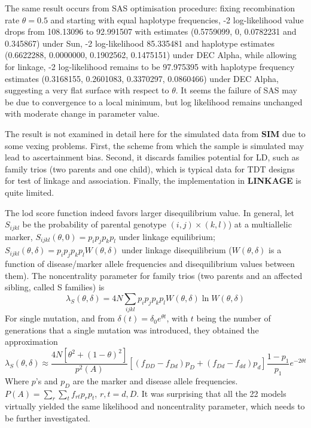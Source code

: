 \documentclass[11pt]{article}
\begin{document}
The same result occurs from SAS optimisation procedure:  fixing recombination
rate $\theta=0.5$ and starting with equal haplotype frequencies, -2
log-likelihood value drops from 108.13096 to 92.991507 with estimates
(0.5759099, 0, 0.0782231 and 0.345867) under Sun, -2 log-likelihood 85.335481
and haplotype estimates (0.6622288, 0.0000000, 0.1902562, 0.1475151) under DEC
Alpha, while allowing for linkage, -2 log-likelihood remains to be 97.975395
with haplotype frequency estimates (0.3168155, 0.2601083, 0.3370297, 0.0860466)
under DEC Alpha, suggesting a very flat surface with respect to $\theta$.  It
seems the failure of SAS may be due to convergence to a local minimum, but log
likelihood remains unchanged with moderate change in parameter value.

The result is not examined in detail here for the simulated data from {\bf
SIM} due to some vexing problems.  First, the scheme from which the sample is
simulated may lead to ascertainment bias.  Second, it discards families
potential for LD, such as family trios (two parents and one child), which is
typical data for TDT designs for test of linkage and association.  Finally, the
implementation in {\bf LINKAGE} is quite limited.

The lod score function indeed favors larger disequilibrium value.  In general,
let $S_{ijkl}$ be the probability of parental genotype $(i,j)\times (k,l)$) at
a multiallelic marker, $S_{ijkl}(\theta, 0)=p_ip_jp_kp_l$ under linkage
equilibrium; $S_{ijkl}(\theta,\delta)=p_ip_jp_kp_lW(\theta,\delta)$ under
linkage disequilibrium ($W(\theta,\delta)$ is a function of disease/marker
allele frequencies and disequilibrium values between them).  The noncentrality
parameter for family trios (two parents and an affected sibling, called S
families) is $$\lambda_S(\theta,\delta)=4N
\sum_{ijkl}p_ip_jp_kp_lW(\theta,\delta)\ln W(\theta,\delta)$$ For single
mutation, and from $\delta(t)=\delta_0e^{\theta t}$, with $t$ being the number
of generations that a single mutation was introduced, they obtained the
approximation $$\lambda_S(\theta,\delta) \approx
\frac{4N[\theta^2+(1-\theta)^2]}{p^2(A)}\left[ (f_{DD}-f_{Dd})p_D
+(f_{Dd}-f_{dd})p_d\right]\frac{1-p_1}{p_1} e^{-2\theta t}$$ Where $p$'s and
$p_D$ are the marker and disease allele frequencies.
$P(A)=\sum_{r}\sum_{t}f_{rt}p_rp_t$, $r,t=d,D$.  
It was surprising that all the 22 models
virtually yielded the same likelihood and noncentrality parameter, which needs
to be further investigated.
\end{document}
